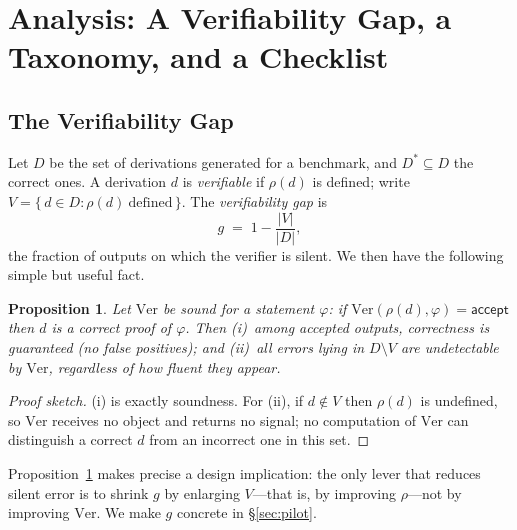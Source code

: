 \documentclass[11pt]{article}
\newcommand{\accept}{\mathsf{accept}}
\theoremstyle{definition}
\theoremstyle{plain}
\newtheorem{proposition}{Proposition}[section]
\theoremstyle{remark}
\begin{document}
\section{Analysis: A Verifiability Gap, a Taxonomy, and a Checklist}\label{sec:analysis}
\subsection{The Verifiability Gap}
Let $D$ be the set of derivations generated for a benchmark, and $D^{*} \subseteq D$ the
correct ones. A derivation $d$ is \emph{verifiable} if $\rho(d)$ is defined; write
$V = \{\,d \in D : \rho(d)\ \text{defined}\,\}$. The \emph{verifiability gap} is
\[
g \;=\; 1 - \frac{|V|}{|D|},
\]
the fraction of outputs on which the verifier is silent. We then have the following simple
but useful fact.

\begin{proposition}\label{prop:sound}
Let $\mathrm{Ver}$ be sound for a statement $\varphi$: if
$\mathrm{Ver}(\rho(d),\varphi) = \accept$ then $d$ is a correct proof of $\varphi$. Then
(i)~among accepted outputs, correctness is guaranteed (no false positives); and
(ii)~all errors lying in $D \setminus V$ are \emph{undetectable} by $\mathrm{Ver}$, regardless
of how fluent they appear.
\end{proposition}

\begin{proof}[Proof sketch]
(i) is exactly soundness. For (ii), if $d \notin V$ then $\rho(d)$ is undefined, so
$\mathrm{Ver}$ receives no object and returns no signal; no computation of $\mathrm{Ver}$ can
distinguish a correct $d$ from an incorrect one in this set. \qedhere
\end{proof}

Proposition~\ref{prop:sound} makes precise a design implication: the only lever that reduces silent error
is to shrink $g$ by enlarging $V$---that is, by improving $\rho$---not by improving
$\mathrm{Ver}$. We make $g$ concrete in \S\ref{sec:pilot}.
\end{document}
